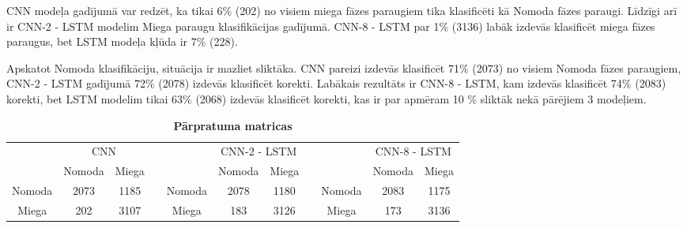 \documentclass[12pt,paper=A4]{report}
\begin{document}
CNN modeļa gadījumā var redzēt, ka tikai 6\% (202) no visiem miega fāzes paraugiem tika klasificēti kā Nomoda fāzes paraugi. Līdzīgi arī ir CNN-2 - LSTM modelim Miega paraugu klasifikācijas gadījumā. CNN-8 - LSTM par 1\% (3136) labāk izdevās klasificēt miega fāzes paraugus, bet LSTM modeļa kļūda ir 7\% (228). 

Apskatot Nomoda klasifikāciju, situācija ir mazliet sliktāka. CNN pareizi izdevās klasificēt 71\% (2073) no visiem Nomoda fāzes paraugiem, CNN-2 - LSTM gadījumā 72\% (2078) izdevās klasificēt korekti. Labākais rezultāts ir CNN-8 - LSTM, kam izdevās klasificēt 74\% (2083) korekti, bet LSTM modelim tikai 63\% (2068) izdevās klasificēt korekti, kas ir par apmēram 10 \% sliktāk nekā pārējiem 3 modeļiem.



\begin{table}[H]
\centering
\caption{}
\captionsetup{justification=centering}
\caption*{\textbf{Pārpratuma matricas}}
\begin{tabular}{lccllccllcc}
 & \multicolumn{2}{c}{CNN} &  &  & \multicolumn{2}{c}{CNN-2 - LSTM} &  &  & \multicolumn{2}{c}{CNN-8 - LSTM} \\ \cline{2-3} \cline{6-7} \cline{10-11} 
\multicolumn{1}{l|}{} & \multicolumn{1}{c|}{Nomoda} & \multicolumn{1}{c|}{Miega} &  & \multicolumn{1}{l|}{} & \multicolumn{1}{c|}{Nomoda} & \multicolumn{1}{c|}{Miega} &  & \multicolumn{1}{l|}{} & \multicolumn{1}{c|}{Nomoda} & \multicolumn{1}{c|}{Miega} \\ \cline{1-3} \cline{5-7} \cline{9-11} 
\multicolumn{1}{|c|}{Nomoda} & \multicolumn{1}{c|}{\cellcolor[HTML]{FFFFC7}2073} & \multicolumn{1}{c|}{1185} & \multicolumn{1}{l|}{} & \multicolumn{1}{c|}{Nomoda} & \multicolumn{1}{c|}{\cellcolor[HTML]{FFFFC7}2078} & \multicolumn{1}{c|}{1180} & \multicolumn{1}{l|}{} & \multicolumn{1}{c|}{Nomoda} & \multicolumn{1}{c|}{\cellcolor[HTML]{FFFFC7}2083} & \multicolumn{1}{c|}{1175} \\ \cline{1-3} \cline{5-7} \cline{9-11} 
\multicolumn{1}{|c|}{Miega} & \multicolumn{1}{c|}{202} & \multicolumn{1}{c|}{\cellcolor[HTML]{FFFFC7}3107} & \multicolumn{1}{l|}{} & \multicolumn{1}{c|}{Miega} & \multicolumn{1}{c|}{183} & \multicolumn{1}{c|}{\cellcolor[HTML]{FFFFC7}3126} & \multicolumn{1}{l|}{} & \multicolumn{1}{c|}{Miega} & \multicolumn{1}{c|}{173} & \multicolumn{1}{c|}{\cellcolor[HTML]{FFFFC7}3136} \\ \cline{1-3} \cline{5-7} \cline{9-11} 
\end{tabular}
\label{tabcoda}
\end{table}
\end{document}
